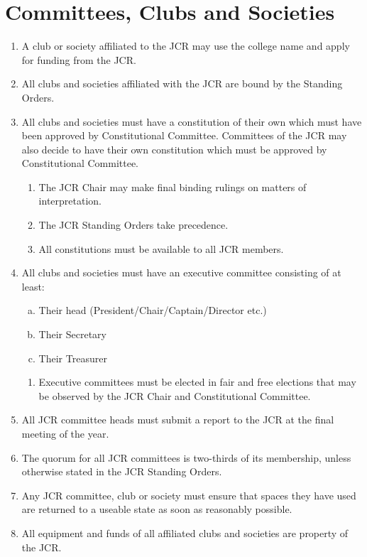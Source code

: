 \documentclass[12pt]{article}  %
\begin{document}
\section{Committees, Clubs and Societies}
\begin{enumerate}
	\item A club or society affiliated to the JCR may use the college name and apply for funding from the JCR.
	\item All clubs and societies affiliated with the JCR are bound by the Standing Orders.
	\item All clubs and societies must have a constitution of their own which must have been approved by Constitutional Committee. Committees of the JCR may also decide to have their own constitution which must be approved by Constitutional Committee.
	\begin{enumerate}
		\item The JCR Chair may make final binding rulings on matters of interpretation. 
		\item The JCR Standing Orders take precedence.
		\item All constitutions must be available to all JCR members.
	\end{enumerate}
	\item All clubs and societies must have an executive committee consisting of at least:
	\begin{enumerate}[(a)]
		\item Their head (President/Chair/Captain/Director etc.)
		\item Their Secretary
		\item Their Treasurer
	\end{enumerate}
	\begin{enumerate}
		\item Executive committees must be elected in fair and free elections that may be observed by the JCR Chair and Constitutional Committee.
	\end{enumerate}
	\item All JCR committee heads must submit a report to the JCR at the final meeting of the year.
	\item The quorum for all JCR committees is two-thirds of its membership, unless otherwise stated in the JCR Standing Orders.
	\item Any JCR committee, club or society must ensure that spaces they have used are returned to a useable state as soon as reasonably possible.
	\item All equipment and funds of all affiliated clubs and societies are property of the JCR.

\end{enumerate}
\end{document}
